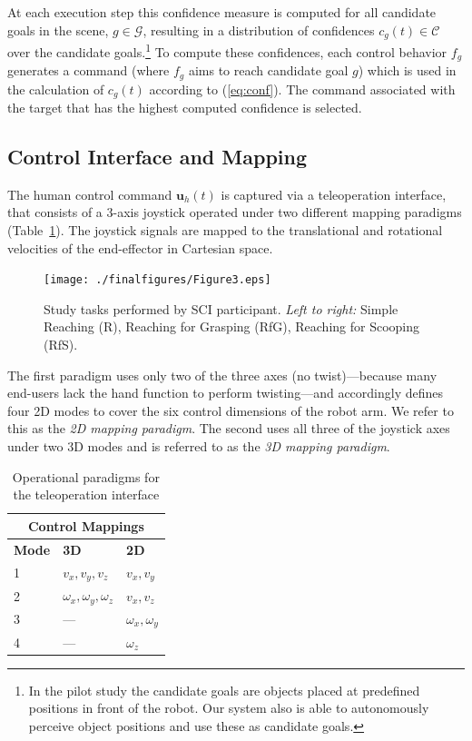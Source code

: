 \documentclass[letterpaper, 10 pt, journal, twoside]{IEEEtran}  %
\begin{document}
	At each execution step this confidence measure is computed for all
	candidate goals in the scene, $g \in \mathcal{G}$, resulting in a
	distribution of confidences $c_{g}(t) \in \mathcal{C}$
	over the candidate goals.\footnote{In the pilot study the candidate goals are objects placed at predefined positions in front of the robot. Our system also is able to autonomously perceive object positions and use these as candidate goals.} To compute these confidences,
	each control behavior $f_g$ generates a command (where $f_g$ aims to
	reach candidate goal $g$) which is used in the calculation of
	$c_g(t)$ according to (\ref{eq:conf}).
	The command associated with the target that has the highest computed confidence is selected.
	\vspace*{-0.15cm}
	\subsection{Control Interface and Mapping} \label{CIM}
	The human control command $\boldsymbol{u}_h(t)$ is captured via a teleoperation interface, that consists of a 3-axis joystick operated under two different mapping paradigms (Table~\ref{tbl:modes}). The joystick signals are mapped to the translational and rotational velocities of the end-effector in Cartesian space.
	\begin{figure}[t]
		\centering
		\texttt{[image: ./finalfigures/Figure3.eps]}
		\caption{Study tasks  performed by SCI participant. \textit{Left to right:} Simple Reaching (R), Reaching for Grasping (RfG), Reaching for Scooping (RfS).}
		\label{TOne}
	\end{figure}
	The first paradigm uses only two of the three axes (no twist)---because many
	end-users lack the hand function to perform twisting---and accordingly
	defines four 2D modes to cover the six control dimensions of the robot
	arm. We refer to this as the \textit{2D mapping paradigm}. The second uses all three of the joystick axes under two 3D modes and is referred to as the \textit{3D mapping paradigm}. 
	
	
	
	\begin{table}
		\centering
		\begin{tabular}{|l|l|l|}
			\hline
			\multicolumn{3}{|c|}{Control Mappings} \\
			\hline
			\textbf{Mode} & \textbf{3D} & \textbf{2D}\\
			\hline
			1 & $v_{x},v_{y},v_{z}$ & $v_{x}, v_{y}$ \\ \hline
			2 & $\omega_{x}, \omega_{y}, \omega_{z}$   & $v_{x}, v_{z}$ \\ \hline
			3 &           ---                   &  $\omega_{x}, \omega_{y}$ \\ \hline
			4 &           ---                   & $\omega_{z}$ \\ \hline
		\end{tabular}
		\vspace{.2cm}
		\caption{Operational paradigms for the teleoperation interface} 
		\label{tbl:modes}
		\vspace{-.5cm}
	\end{table}
	
\end{document}
